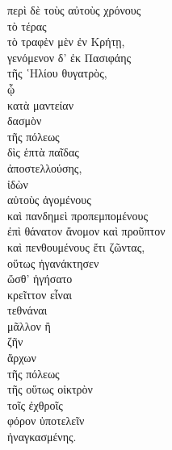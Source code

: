 {\large
\begin{greek}
\noindent περὶ δὲ τοὺς αὐτοὺς χρόνους \\
τὸ τέρας \\
\tabto{2em} τὸ τραφὲν μὲν ἐν Κρήτῃ, \\
\tabto{2em} γενόμενον δ' ἐκ Πασιφάης \\
\tabto{4em} τῆς ῾Ηλίου θυγατρὸς, \\
\tabto{2em} ᾧ \\
\tabto{4em} κατὰ μαντείαν \\
\tabto{2em} δασμὸν \\
\tabto{4em} τῆς πόλεως \\
\tabto{2em} δὶς ἑπτὰ παῖδας \\
\tabto{4em} ἀποστελλούσης, \\
ἰδὼν \\
\tabto{2em} αὐτοὺς ἀγομένους \\
\tabto{2em} καὶ πανδημεὶ προπεμπομένους \\
\tabto{4em} ἐπὶ θάνατον ἄνομον καὶ προῦπτον \\
\tabto{2em} καὶ πενθουμένους ἔτι ζῶντας, \\
οὕτως ἠγανάκτησεν \\
\tabto{2em} ὥσθ' ἡγήσατο \\
\tabto{4em} κρεῖττον εἶναι \\
\tabto{6em} τεθνάναι \\
\tabto{4em} μᾶλλον ἢ\\
\tabto{6em} ζῆν \\
\tabto{6em} ἄρχων \\
\tabto{8em} τῆς πόλεως \\
\tabto{10em} τῆς οὕτως οἰκτρὸν \\
\tabto{12em} τοῖς ἐχθροῖς \\
\tabto{12em} φόρον ὑποτελεῖν \\
\tabto{10em} ἠναγκασμένης. \\

\end{greek}
}

